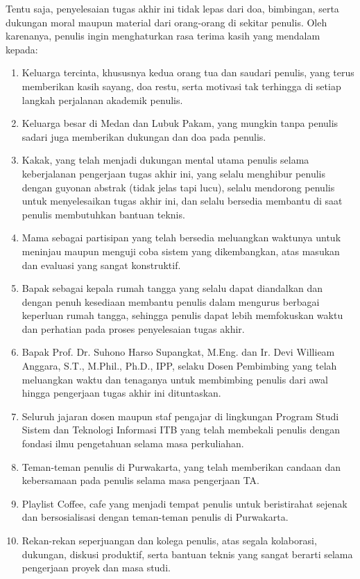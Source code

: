 Tentu saja, penyelesaian tugas akhir ini tidak lepas dari doa, bimbingan, serta dukungan moral maupun material dari orang-orang di sekitar penulis. Oleh karenanya, penulis ingin menghaturkan rasa terima kasih yang mendalam kepada:

\begin{enumerate}
    \item Keluarga tercinta, khususnya kedua orang tua dan saudari penulis, yang terus memberikan kasih sayang, doa restu, serta motivasi tak terhingga di setiap langkah perjalanan akademik penulis.
    \item Keluarga besar di Medan dan Lubuk Pakam, yang mungkin tanpa penulis sadari juga memberikan dukungan dan doa pada penulis.
    \item Kakak, yang telah menjadi dukungan mental utama penulis selama keberjalanan pengerjaan tugas akhir ini, yang selalu menghibur penulis dengan guyonan abstrak (tidak jelas tapi lucu), selalu mendorong penulis untuk menyelesaikan tugas akhir ini, dan selalu bersedia membantu di saat penulis membutuhkan bantuan teknis.
    \item Mama sebagai partisipan yang telah bersedia meluangkan waktunya untuk meninjau maupun menguji coba sistem yang dikembangkan, atas masukan dan evaluasi yang sangat konstruktif.
    \item Bapak sebagai kepala rumah tangga yang selalu dapat diandalkan dan dengan penuh kesediaan membantu penulis dalam mengurus berbagai keperluan rumah tangga, sehingga penulis dapat lebih memfokuskan waktu dan perhatian pada proses penyelesaian tugas akhir.
    \item Bapak Prof. Dr. Suhono Harso Supangkat, M.Eng. dan Ir. Devi Willieam Anggara, S.T., M.Phil., Ph.D., IPP, selaku Dosen Pembimbing yang telah meluangkan waktu dan tenaganya untuk membimbing penulis dari awal hingga pengerjaan tugas akhir ini dituntaskan.
    \item Seluruh jajaran dosen maupun staf pengajar di lingkungan Program Studi Sistem dan Teknologi Informasi ITB yang telah membekali penulis dengan fondasi ilmu pengetahuan selama masa perkuliahan.
    \item Teman-teman penulis di Purwakarta, yang telah memberikan candaan dan kebersamaan pada penulis selama masa pengerjaan TA.
    \item Playlist Coffee, cafe yang menjadi tempat penulis untuk beristirahat sejenak dan bersosialisasi dengan teman-teman penulis di Purwakarta.
    \item Rekan-rekan seperjuangan dan kolega penulis, atas segala kolaborasi, dukungan, diskusi produktif, serta bantuan teknis yang sangat berarti selama pengerjaan proyek dan masa studi.

\end{enumerate}

